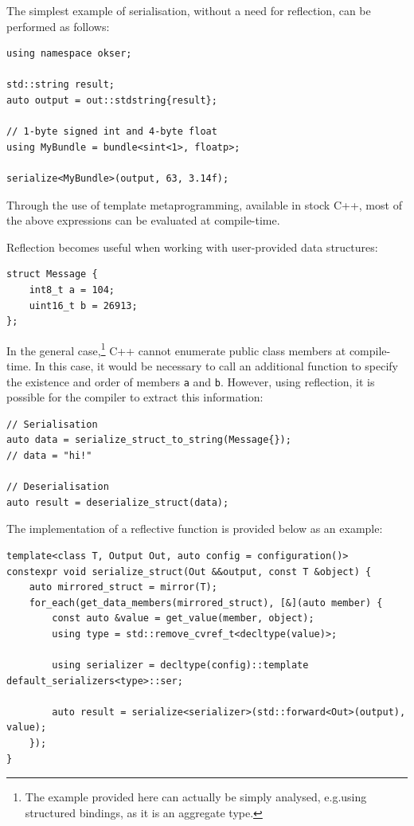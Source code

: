 \documentclass[a4paper,nobib,justified,final]{tufte-book}
\begin{document}
The simplest example of serialisation, without a need for reflection, can be performed as follows:
\begin{verbatim}
using namespace okser;

std::string result;
auto output = out::stdstring{result};

// 1-byte signed int and 4-byte float
using MyBundle = bundle<sint<1>, floatp>;

serialize<MyBundle>(output, 63, 3.14f);
\end{verbatim}
Through the use of template metaprogramming, available in stock C++, most of the above expressions can be evaluated at compile-time.

Reflection becomes useful when working with user-provided data structures:
\begin{verbatim}
struct Message {
    int8_t a = 104;
    uint16_t b = 26913;
};
\end{verbatim}
In the general case,\footnote{The example provided here can actually be simply analysed, e.g.\@ using structured bindings, as it is an aggregate type.} C++ cannot enumerate public class members at compile-time. In this case, it would be necessary to call an additional function to specify the existence and order of members \texttt{a} and \texttt{b}. However, using reflection, it is possible for the compiler to extract this information:
\begin{verbatim}
// Serialisation
auto data = serialize_struct_to_string(Message{});
// data = "hi!"

// Deserialisation
auto result = deserialize_struct(data);
\end{verbatim}

The implementation of a reflective function is provided below as an example:
\begin{fullwidth}%
\begin{verbatim}
template<class T, Output Out, auto config = configuration()>
constexpr void serialize_struct(Out &&output, const T &object) {
    auto mirrored_struct = mirror(T);
    for_each(get_data_members(mirrored_struct), [&](auto member) {
        const auto &value = get_value(member, object);
        using type = std::remove_cvref_t<decltype(value)>;

        using serializer = decltype(config)::template default_serializers<type>::ser;

        auto result = serialize<serializer>(std::forward<Out>(output), value);
    });
}
\end{verbatim}
\end{fullwidth}
\end{document}
